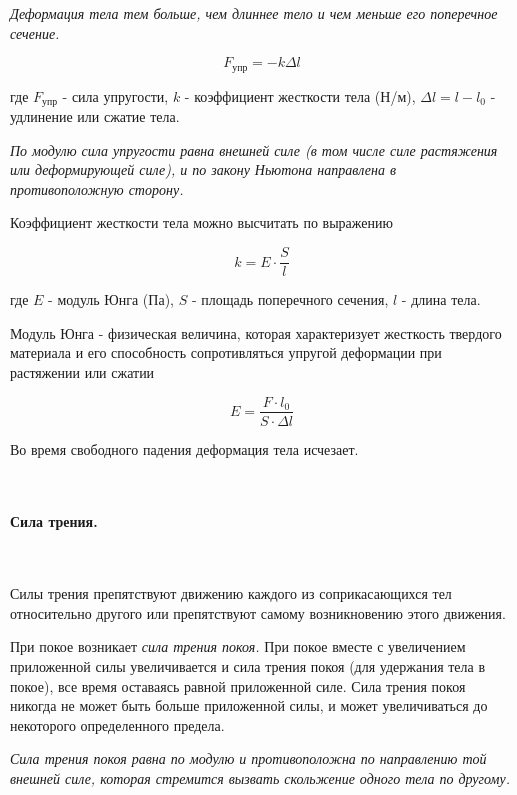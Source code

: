 \documentclass[a4paper,12pt]{article}
\begin{document}
		\textit{Деформация тела тем больше, чем длиннее тело и чем меньше его поперечное 
		сечение.}

		\begin{equation}
			F_{\text{упр}} = -k \Delta l
		\end{equation}

		где $F_{\text{упр}}$ - сила упругости, $k$ - коэффициент жесткости тела (Н/м),
		$\Delta l = l-l_0$ - удлинение или сжатие тела.

		\textit{По модулю сила упругости равна внешней силе (в том числе силе растяжения или 
		деформирующей силе), и по закону Ньютона направлена в противоположную сторону.}

		Коэффициент жесткости тела можно высчитать по выражению

		\begin{equation}
			k = E \cdot \frac{S}{l}
		\end{equation}

		где $E$ - модуль Юнга (Па), $S$ - площадь поперечного сечения, $l$ - длина тела.

		Модуль Юнга - физическая величина, которая характеризует жесткость твердого 
		материала и его способность сопротивляться упругой деформации при растяжении 
		или сжатии

		\begin{equation}
			E = \frac{F \cdot l_0}{S \cdot \Delta l}
		\end{equation}

		Во время свободного падения деформация тела исчезает.

		\

		\paragraph{Сила трения.} \

		Силы трения препятствуют движению каждого из соприкасающихся
		тел относительно другого или препятствуют самому возникновению
		этого движения.

		При покое возникает \textit{сила трения покоя.} 
		При покое вместе с увеличением приложенной силы увеличивается 
		и сила трения покоя (для удержания тела в покое), все время 
		оставаясь равной приложенной силе.
		Сила трения покоя никогда не может быть больше приложенной силы,
		и может увеличиваться до некоторого определенного предела.

		\textit{Сила трения покоя равна по модулю и противоположна по направлению
		той внешней силе, которая стремится вызвать скольжение одного тела по 
		другому.}
\end{document}
